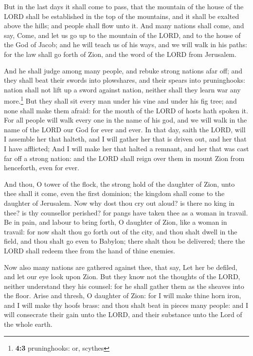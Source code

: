 But in the last days it shall come to pass, that the
mountain of the house of the LORD shall be established in the top of the
mountains, and it shall be exalted above the hills; and people shall
flow unto it.  And many nations shall come, and say, Come,
and let us go up to the mountain of the LORD, and to the house of the
God of Jacob; and he will teach us of his ways, and we will walk in his
paths: for the law shall go forth of Zion, and the word of the LORD from
Jerusalem.

 And he shall judge among many people, and rebuke strong
nations afar off; and they shall beat their swords into plowshares, and
their spears into pruninghooks: nation shall not lift up a sword against
nation, neither shall they learn war any more.\footnote{\textbf{4:3}
  pruninghooks: or, scythes}  But they shall sit every man
under his vine and under his fig tree; and none shall make them afraid:
for the mouth of the LORD of hosts hath spoken it.  For
all people will walk every one in the name of his god, and we will walk
in the name of the LORD our God for ever and ever.  In
that day, saith the LORD, will I assemble her that halteth, and I will
gather her that is driven out, and her that I have afflicted;
 And I will make her that halted a remnant, and her that
was cast far off a strong nation: and the LORD shall reign over them in
mount Zion from henceforth, even for ever.

 And thou, O tower of the flock, the strong hold of the
daughter of Zion, unto thee shall it come, even the first dominion; the
kingdom shall come to the daughter of Jerusalem.  Now why
dost thou cry out aloud? is there no king in thee? is thy counsellor
perished? for pangs have taken thee as a woman in travail.
 Be in pain, and labour to bring forth, O daughter of
Zion, like a woman in travail: for now shalt thou go forth out of the
city, and thou shalt dwell in the field, and thou shalt go even to
Babylon; there shalt thou be delivered; there the LORD shall redeem thee
from the hand of thine enemies.

 Now also many nations are gathered against thee, that
say, Let her be defiled, and let our eye look upon Zion. 
But they know not the thoughts of the LORD, neither understand they his
counsel: for he shall gather them as the sheaves into the floor.
 Arise and thresh, O daughter of Zion: for I will make
thine horn iron, and I will make thy hoofs brass: and thou shalt beat in
pieces many people: and I will consecrate their gain unto the LORD, and
their substance unto the Lord of the whole earth.

